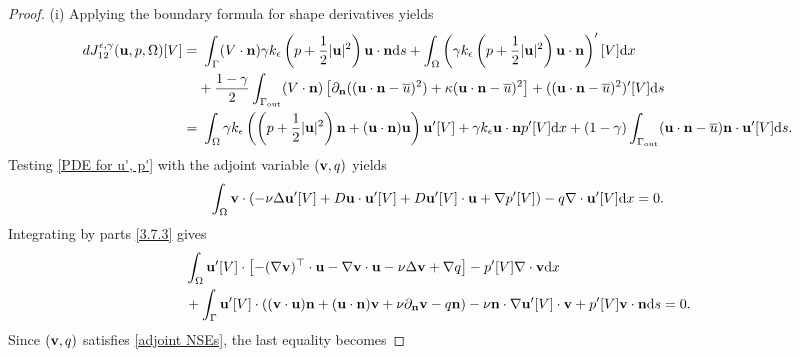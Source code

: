 \documentclass[oneside,11pt]{book}
\numberwithin{equation}{section}
\begin{document}
\begin{proof}
    (i) Applying the boundary formula for shape derivatives yields
    \begin{align}
        dJ_{12}^{\epsilon,\gamma}({\bf u},p,\Omega)[V] =&\ \int_\Gamma (V\cdot{\bf n})\gamma k_\epsilon\left(p + \frac{1}{2}|{\bf u}|^2\right){\bf u}\cdot{\bf n}{\rm d}s + \int_\Omega \left(\gamma k_\epsilon\left(p + \frac{1}{2}|{\bf u}|^2\right){\bf u}\cdot{\bf n}\right)'[V]{\rm d}x\\
        &+\frac{1 - \gamma}{2}\int_{\Gamma_{\rm out}} (V\cdot{\bf n})\left[\partial_{\bf n}(({\bf u}\cdot{\bf n} - \overline{u})^2) + \kappa({\bf u}\cdot{\bf n} - \overline{u})^2\right] + (({\bf u}\cdot{\bf n} - \overline{u})^2)'[V]{\rm d}s\\
        =&\ \int_\Omega \gamma k_\epsilon\left(\left(p + \frac{1}{2}|{\bf u}|^2\right){\bf n} + ({\bf u}\cdot{\bf n}){\bf u}\right){\bf u}'[V] + \gamma k_\epsilon{\bf u}\cdot{\bf n}p'[V]{\rm d}x + (1 - \gamma)\int_{\Gamma_{\rm out}} ({\bf u}\cdot{\bf n} - \overline{u}){\bf n}\cdot{\bf u}'[V]{\rm d}s.\label{3.7.6}
    \end{align}
    Testing \eqref{PDE for u', p'} with the adjoint variable $({\bf v},q)$ yields
    \begin{align}
        \label{3.7.3}
        \int_\Omega {\bf v}\cdot(-\nu\Delta{\bf u}'[V] + D{\bf u}\cdot{\bf u}'[V] + D{\bf u}'[V]\cdot{\bf u} + \nabla p'[V]) - q\nabla\cdot{\bf u}'[V] {\rm d}x = 0.
    \end{align}
    Integrating by parts \eqref{3.7.3} gives
    \begin{align}
        &\int_\Omega {\bf u}'[V]\cdot\left[-(\nabla{\bf v})^\top\cdot{\bf u} - \nabla{\bf v}\cdot{\bf u} -\nu\Delta{\bf v} + \nabla q\right] - p'[V]\nabla\cdot{\bf v}{\rm d}x\\
        &+ \int_\Gamma {\bf u}'[V]\cdot(({\bf v}\cdot{\bf u}){\bf n} + ({\bf u}\cdot{\bf n}){\bf v} + \nu\partial_{\bf n}{\bf v} - q{\bf n}) - \nu{\bf n}\cdot\nabla{\bf u}'[V]\cdot{\bf v} + p'[V]{\bf v}\cdot{\bf n}{\rm d}s = 0.
    \end{align}
    Since $({\bf v},q)$ satisfies \eqref{adjoint NSEs}, the last equality becomes

\end{proof}
\end{document}
